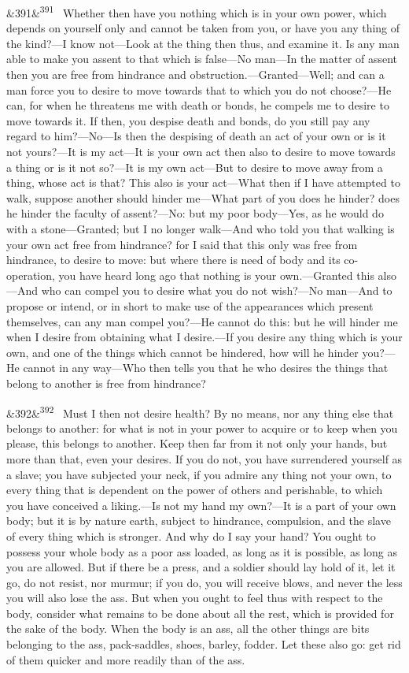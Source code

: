 \documentclass[12pt]{article}
\newcommand{\para}[1][]{\par\noindent\ifx&#1&\else\textsuperscript{\footnotesize #1}~\fi}
\begin{document}
\para[391] Whether then have you nothing which is in your own power, which depends on yourself only and cannot be taken from you, or have you any thing of the kind?—I know not—Look at the thing then thus, and examine it. Is any man able to make you assent to that which is false—No man—In the matter of assent then you are free from hindrance and obstruction.—Granted—Well; and can a man force you to desire to move towards that to which you do not choose?—He can, for when he threatens me with death or bonds, he compels me to desire to move towards it. If then, you despise death and bonds, do you still pay any regard to him?—No—Is then the despising of death an act of your own or is it not yours?—It is my act—It is your own act then also to desire to move towards a thing or is it not so?—It is my own act—But to desire to move away from a thing, whose act is that? This also is your act—What then if I have attempted to walk, suppose another should hinder me—What part of you does he hinder? does he hinder the faculty of assent?—No: but my poor body—Yes, as he would do with a stone—Granted; but I no longer walk—And who told you that walking is your own act free from hindrance? for I said that this only was free from hindrance, to desire to move: but where there is need of body and its co-operation, you have heard long ago that nothing is your own.—Granted this also—And who can compel you to desire what you do not wish?—No man—And to propose or intend, or in short to make use of the appearances which present themselves, can any man compel you?—He cannot do this: but he will hinder me when I desire from obtaining what I desire.—If you desire any thing which is your own, and one of the things which cannot be hindered, how will he hinder you?—He cannot in any way—Who then tells you that he who desires the things that belong to another is free from hindrance?

\para[392] Must I then not desire health? By no means, nor any thing else that belongs to another: for what is not in your power to acquire or to keep when you please, this belongs to another. Keep then far from it not only your hands, but more than that, even your desires. If you do not, you have surrendered yourself as a slave; you have subjected your neck, if you admire any thing not your own, to every thing that is dependent on the power of others and perishable, to which you have conceived a liking.—Is not my hand my own?—It is a part of your own body; but it is by nature earth, subject to hindrance, compulsion, and the slave of every thing which is stronger. And why do I say your hand? You ought to possess your whole body as a poor ass loaded, as long as it is possible, as long as you are allowed. But if there be a press, and a soldier should lay hold of it, let it go, do not resist, nor murmur; if you do, you will receive blows, and never the less you will also lose the ass. But when you ought to feel thus with respect to the body, consider what remains to be done about all the rest, which is provided for the sake of the body. When the body is an ass, all the other things are bits belonging to the ass, pack-saddles, shoes, barley, fodder. Let these also go: get rid of them quicker and more readily than of the ass.
\end{document}
